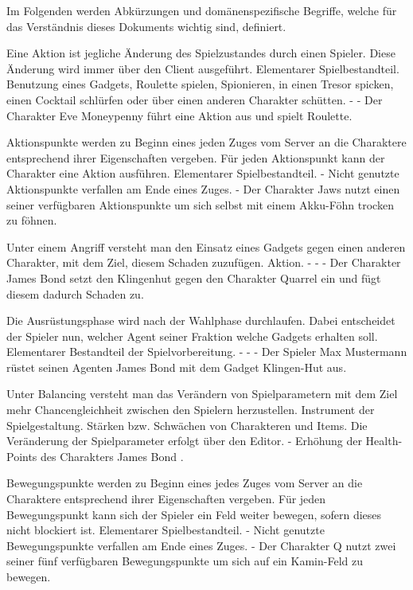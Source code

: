 Im Folgenden werden Abkürzungen und domänenspezifische Begriffe, welche für das Verständnis dieses Dokuments wichtig sind, definiert.

{Eine Aktion ist jegliche Änderung des Spielzustandes durch einen Spieler. Diese Änderung wird immer über den Client ausgeführt. }
{Elementarer Spielbestandteil.}
{Benutzung eines Gadgets, Roulette spielen, Spionieren, in einen Tresor spicken, einen Cocktail schlürfen oder über einen anderen Charakter schütten.}
{-}
{-}
{Der Charakter \glqq{}Eve Moneypenny\grqq{} {} führt eine Aktion aus und spielt Roulette.}

{Aktionspunkte werden zu Beginn eines jeden Zuges vom Server an die Charaktere entsprechend ihrer Eigenschaften vergeben. Für jeden Aktionspunkt kann der Charakter eine Aktion ausführen.}
{Elementarer Spielbestandteil.}
{-}
{Nicht genutzte Aktionspunkte verfallen am Ende eines Zuges.}
{-}
{Der Charakter \glqq{}Jaws\grqq{} {} nutzt einen seiner verfügbaren Aktionspunkte um sich selbst mit einem \glqq{}Akku-Föhn\grqq{} {} trocken zu föhnen.}

{Unter einem Angriff versteht man den Einsatz eines Gadgets gegen einen anderen Charakter, mit dem Ziel, diesem Schaden zuzufügen.}
{Aktion.}
{-}
{-}
{-}
{Der Charakter \glqq{}James Bond\grqq{} {} setzt den \glqq{}Klingenhut\grqq{} gegen den Charakter \glqq{}Quarrel\grqq{} ein und fügt diesem dadurch Schaden zu.}

{Die Ausrüstungsphase wird nach der Wahlphase durchlaufen. Dabei entscheidet der Spieler nun, welcher Agent seiner Fraktion welche Gadgets erhalten soll. }
{Elementarer Bestandteil der Spielvorbereitung.}
{-}
{-}
{-}
{Der Spieler \glqq{}Max Mustermann\grqq{} rüstet seinen Agenten \glqq{}James Bond\grqq{} mit dem Gadget \glqq{}Klingen-Hut\grqq{} aus.}

{Unter Balancing versteht man das Verändern von Spielparametern mit dem Ziel mehr Chancengleichheit zwischen den Spielern herzustellen.}
{Instrument der Spielgestaltung.}
{Stärken bzw. Schwächen von Charakteren und Items.}
{Die Veränderung der Spielparameter erfolgt über den Editor.}
{-}
{Erhöhung der Health-Points des Charakters \glqq{}James Bond \grqq{} .}

{Bewegungspunkte werden zu Beginn eines jedes Zuges vom Server an die Charaktere entsprechend ihrer Eigenschaften vergeben. Für jeden Bewegungspunkt kann sich der Spieler ein Feld weiter bewegen, sofern dieses nicht blockiert ist.}
{Elementarer Spielbestandteil.}
{-}
{Nicht genutzte Bewegungspunkte verfallen am Ende eines Zuges.}
{-}
{Der Charakter \glqq{}Q\grqq{} nutzt zwei seiner fünf verfügbaren Bewegungspunkte um sich auf ein Kamin-Feld zu bewegen.}

